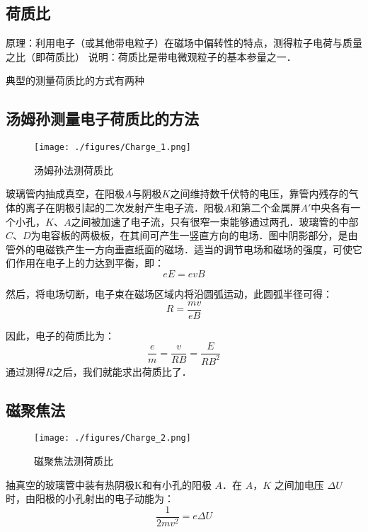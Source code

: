 
\subsection{荷质比}
原理：利用电子（或其他带电粒子）在磁场中偏转性的特点，测得粒子电荷与质量之比（即荷质比）
说明：荷质比是带电微观粒子的基本参量之一．

典型的测量荷质比的方式有两种

\subsection{汤姆孙测量电子荷质比的方法}

\begin{figure}[ht]
\centering
\texttt{[image: ./figures/Charge\_1.png]}
\caption{汤姆孙法测荷质比} \label{Charge_fig1}
\end{figure}

玻璃管内抽成真空，在阳极$A$与阴极$K$之间维持数千伏特的电压，靠管内残存的气体的离子在阴极引起的二次发射产生电子流．阳极$A$和第二个金属屏$A'$中央各有一个小孔，$K$、$A$之间被加速了电子流，只有很窄一束能够通过两孔．玻璃管的中部$C$、$D$为电容板的两极板，在其间可产生一竖直方向的电场．图中阴影部分，是由管外的电磁铁产生一方向垂直纸面的磁场．适当的调节电场和磁场的强度，可使它们作用在电子上的力达到平衡，即：
\begin{equation}
eE=evB
\end{equation}

然后，将电场切断，电子束在磁场区域内将沿圆弧运动，此圆弧半径可得：
\begin{equation}
R=\frac {mv}{eB}
\end{equation}

因此，电子的荷质比为：
\begin{equation}
\frac{e}{m}=\frac{v}{RB}=\frac {E}{RB^2}
\end{equation}
通过测得$R$之后，我们就能求出荷质比了．

\subsection{磁聚焦法}

\begin{figure}[ht]
\centering
\texttt{[image: ./figures/Charge\_2.png]}
\caption{磁聚焦法测荷质比} \label{Charge_fig2}
\end{figure}

抽真空的玻璃管中装有热阴极K和有小孔的阳极 $A$．在 $A$，$K$ 之间加电压 $\Delta U$ 时，由阳极的小孔射出的电子动能为：
\begin{equation}
\frac{1}{2mv^2}=e\Delta U
\end{equation}

